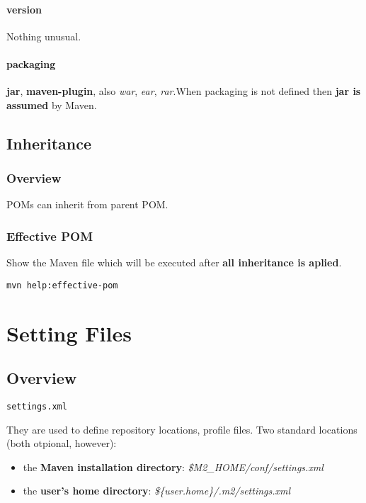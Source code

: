 \documentclass{report}
\begin{document}
\subsection{version}
Nothing unusual.

\subsection{packaging}
\textbf{jar}, \textbf{maven-plugin}, also \textit{war}, \textit{ear}, \textit{rar}.When packaging is not defined then \textbf{jar is assumed} by Maven.



\chapter{Inheritance}


\section{Overview}
POMs can inherit from parent POM.


\section{Effective POM}
Show the Maven file which will be executed after \textbf{all inheritance is aplied}.
\begin{verbatim}
mvn help:effective-pom
\end{verbatim}




\part{Setting Files}



\chapter{Overview}

\begin{verbatim}
settings.xml
\end{verbatim}

They are used to define repository locations, profile files. Two standard locations (both otpional, however):
\begin{itemize}
	\item the \textbf{Maven installation directory}: \textit{\$M2\_HOME/conf/settings.xml}
	\item the \textbf{user's home directory}: \textit{\$\{user.home\}/.m2/settings.xml}
\end{itemize}
\end{document}
